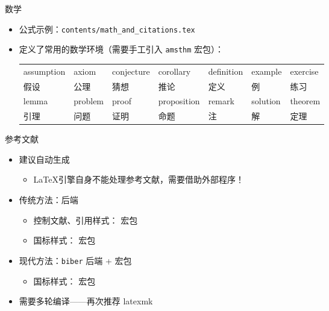 \begin{frame}[fragile]{数学}
  \begin{itemize}
    \item 公式示例：\verb|contents/math_and_citations.tex|
    \item \SJTUThesis{} 定义了常用的数学环境（需要手工引入 \verb|amsthm| 宏包）：
          \begin{table}[h]
            \centering
            \footnotesize
            \begin{tabular}{*{7}{l}}\toprule
              assumption & axiom    & conjecture & corollary   & definition &
              example    & exercise
              \\
              假设         & 公理       & 猜想         & 推论          & 定义         & 例 & 练习
              \\\midrule
              lemma      & problem  & proof      & proposition & remark     &
              solution   & theorem
              \\
              引理         & 问题       & 证明         & 命题          & 注          & 解 &
              定理
              \\\bottomrule
            \end{tabular}
          \end{table}
  \end{itemize}
\end{frame}

\begin{frame}[fragile]{参考文献}
  \begin{itemize}
    \item 建议自动生成
          \begin{itemize}
            \item \LaTeX 引擎自身不能处理参考文献，需要借助外部程序！
          \end{itemize}
    \item 传统方法：\BibTeX 后端
          \begin{itemize}
            \item 控制文献、引用样式： 宏包
            \item 国标样式： 宏包
          \end{itemize}
    \item 现代方法：\verb|biber| 后端 +  宏包
          \begin{itemize}
            \item 国标样式： 宏包
          \end{itemize}
    \item 需要多轮编译——再次推荐 latexmk
  \end{itemize}
\end{frame}

